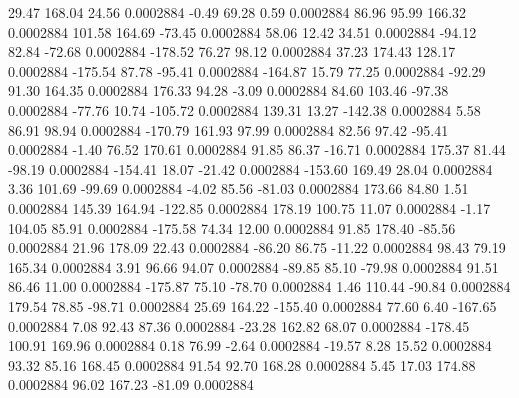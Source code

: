        29.47      168.04       24.56     0.0002884
       -0.49       69.28        0.59     0.0002884
       86.96       95.99      166.32     0.0002884
      101.58      164.69      -73.45     0.0002884
       58.06       12.42       34.51     0.0002884
      -94.12       82.84      -72.68     0.0002884
     -178.52       76.27       98.12     0.0002884
       37.23      174.43      128.17     0.0002884
     -175.54       87.78      -95.41     0.0002884
     -164.87       15.79       77.25     0.0002884
      -92.29       91.30      164.35     0.0002884
      176.33       94.28       -3.09     0.0002884
       84.60      103.46      -97.38     0.0002884
      -77.76       10.74     -105.72     0.0002884
      139.31       13.27     -142.38     0.0002884
        5.58       86.91       98.94     0.0002884
     -170.79      161.93       97.99     0.0002884
       82.56       97.42      -95.41     0.0002884
       -1.40       76.52      170.61     0.0002884
       91.85       86.37      -16.71     0.0002884
      175.37       81.44      -98.19     0.0002884
     -154.41       18.07      -21.42     0.0002884
     -153.60      169.49       28.04     0.0002884
        3.36      101.69      -99.69     0.0002884
       -4.02       85.56      -81.03     0.0002884
      173.66       84.80        1.51     0.0002884
      145.39      164.94     -122.85     0.0002884
      178.19      100.75       11.07     0.0002884
       -1.17      104.05       85.91     0.0002884
     -175.58       74.34       12.00     0.0002884
       91.85      178.40      -85.56     0.0002884
       21.96      178.09       22.43     0.0002884
      -86.20       86.75      -11.22     0.0002884
       98.43       79.19      165.34     0.0002884
        3.91       96.66       94.07     0.0002884
      -89.85       85.10      -79.98     0.0002884
       91.51       86.46       11.00     0.0002884
     -175.87       75.10      -78.70     0.0002884
        1.46      110.44      -90.84     0.0002884
      179.54       78.85      -98.71     0.0002884
       25.69      164.22     -155.40     0.0002884
       77.60        6.40     -167.65     0.0002884
        7.08       92.43       87.36     0.0002884
      -23.28      162.82       68.07     0.0002884
     -178.45      100.91      169.96     0.0002884
        0.18       76.99       -2.64     0.0002884
      -19.57        8.28       15.52     0.0002884
       93.32       85.16      168.45     0.0002884
       91.54       92.70      168.28     0.0002884
        5.45       17.03      174.88     0.0002884
       96.02      167.23      -81.09     0.0002884
